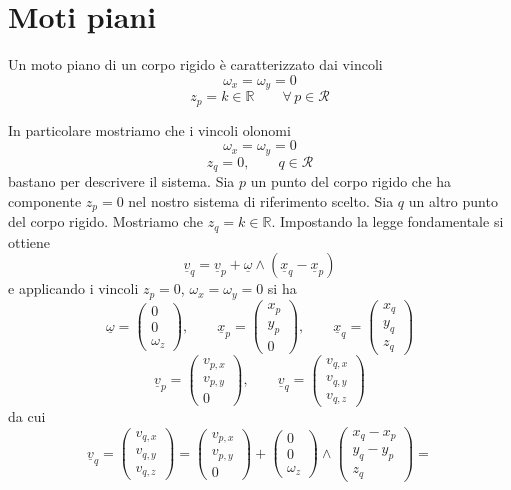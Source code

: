\chapter{Moti piani}
Un moto piano di un corpo rigido è caratterizzato dai vincoli
\[
\omega_x=\omega_y=0
\]
\[
z_p=k\in\mathbb{R}\qquad \forall\, p \in\mathcal{R}
\]

In particolare mostriamo che i vincoli olonomi
\[
\omega_x=\omega_y=0
\]
\[
z_q=0,\qquad q\in\mathcal{R}
\]
bastano per descrivere il sistema. Sia $p$ un punto del corpo rigido che ha componente $z_p=0$ nel nostro sistema di riferimento scelto. Sia $q$ un altro punto del corpo rigido. Mostriamo che $z_q=k\in\mathbb{R}$. Impostando la legge fondamentale si ottiene
\[
\underline{v}_q=\underline{v}_p+\underline{\omega}\wedge(\underline{x}_q-\underline{x}_p)
\]
e applicando i vincoli $z_p=0$, $\omega_x=\omega_y=0$ si ha
\[
\underline{\omega}=
\begin{pmatrix}
0\\
0\\
\omega_z
\end{pmatrix},
\qquad
\underline{x}_p=
\begin{pmatrix}
x_p\\
y_p\\
0
\end{pmatrix},
\qquad
\underline{x}_q=
\begin{pmatrix}
x_q\\
y_q\\
z_q
\end{pmatrix}
\]
\[
\underline{v}_p=
\begin{pmatrix}
v_{p,x}\\
v_{p,y}\\
0
\end{pmatrix},
\qquad
\underline{v}_q=
\begin{pmatrix}
v_{q,x}\\
v_{q,y}\\
v_{q,z}
\end{pmatrix}
\]
da cui
\[
\underline{v}_q=
\begin{pmatrix}
v_{q,x}\\
v_{q,y}\\
v_{q,z}
\end{pmatrix}
=
\begin{pmatrix}
v_{p,x}\\
v_{p,y}\\
0
\end{pmatrix}
+
\begin{pmatrix}
0\\
0\\
\omega_z
\end{pmatrix}
\wedge
\begin{pmatrix}
x_q-x_p\\
y_q-y_p\\
z_q
\end{pmatrix}
=
\]
